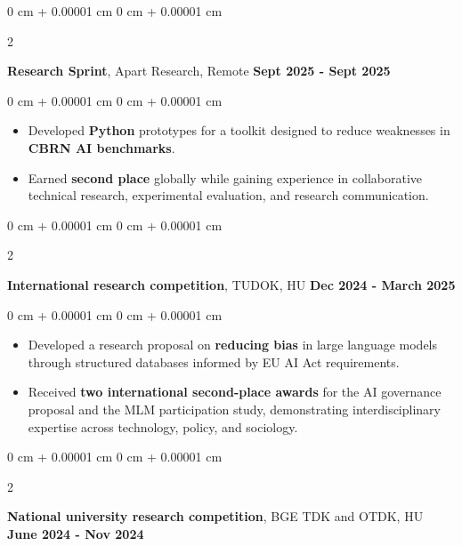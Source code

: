 \documentclass[10pt, letterpaper]{article}
\newenvironment{highlights}{
    \begin{itemize}[
        topsep=0.10 cm,
        parsep=0.10 cm,
        partopsep=0pt,
        itemsep=0pt,
        leftmargin=0 cm + 10pt
    ]
}{
    \end{itemize}
} %
\newenvironment{onecolentry}{
    \begin{adjustwidth}{
        0 cm + 0.00001 cm
    }{
        0 cm + 0.00001 cm
    }
}{
    \end{adjustwidth}
} %
\newenvironment{twocolentry}[2][]{
    \onecolentry
    \def\secondColumn{#2}
    \setcolumnwidth{\fill, 4.5 cm}
    \begin{paracol}{2}
}{
    \switchcolumn \raggedleft \secondColumn
    \end{paracol}
    \endonecolentry
} %
\begin{document}
        \begin{twocolentry}{
        \textbf{Sept 2025 - Sept 2025}
        }
            \textbf{Research Sprint}, Apart Research, Remote\end{twocolentry}

        \vspace{0.1 cm}

        \begin{onecolentry}
            \begin{highlights}
                \item Developed \textbf{Python} prototypes for a toolkit designed to reduce weaknesses in \textbf{CBRN AI benchmarks}.
                \item Earned \textbf{second place} globally while gaining experience in collaborative technical research, experimental evaluation, and research communication.
            \end{highlights}
        \end{onecolentry}

        \vspace{0.2 cm}
        
        \begin{twocolentry}{
        \textbf{Dec 2024 - March 2025}
        }
            \textbf{International research competition}, TUDOK, HU\end{twocolentry}

        \vspace{0.1 cm}

        \begin{onecolentry}
            \begin{highlights}
                \item Developed a research proposal on \textbf{reducing bias} in large language models through structured databases informed by EU AI Act requirements.
                \item Received \textbf{two international second-place awards} for the AI governance proposal and the MLM participation study, demonstrating interdisciplinary expertise across technology, policy, and sociology.
            \end{highlights}
        \end{onecolentry}

        \vspace{0.2 cm}

        \begin{twocolentry}{
        \textbf{June 2024 - Nov 2024}
        }
            \textbf{National university research competition}, BGE TDK and OTDK, HU\end{twocolentry}
\end{document}
